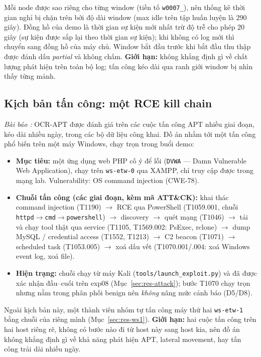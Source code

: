 Mỗi node được sao riêng cho từng window (tiền tố \texttt{w0007\_}), nên thống kê thời gian nghỉ bị chặn trên bởi độ dài window (max idle trên tập huấn luyện là 290 giây). Đồng hồ của demo là thời gian sự kiện mới nhất trừ độ trễ cho phép 20 giây (sự kiện được sắp lại theo thời gian sự kiện); khi không có log mới thì chuyển sang đồng hồ của máy chủ. Window bắt đầu trước khi bắt đầu thu thập được đánh dấu \emph{partial} và không chấm. \textbf{Giới hạn:} không khẳng định gì về chất lượng phát hiện trên toàn bộ log; tấn công kéo dài qua ranh giới window bị nhìn thấy từng mảnh.

\subsection{Kịch bản tấn công: một RCE kill chain}
\label{sec:dev-attack}

\textit{Bài báo \cite{aly2025ocrapt}:} OCR-APT được đánh giá trên các cuộc tấn công APT nhiều giai đoạn, kéo dài nhiều ngày, trong các bộ dữ liệu công khai. Đồ án nhắm tới một tấn công phổ biến trên một máy Windows, chạy trọn trong buổi demo:
\begin{itemize}
    \item \textbf{Mục tiêu:} một ứng dụng web PHP cố ý để lỗi (\texttt{DVWA} --- Damn Vulnerable Web Application), chạy trên \texttt{ws-etw-0} qua XAMPP, chỉ truy cập được trong mạng lab. Vulnerability: OS command injection (CWE-78).
    \item \textbf{Chuỗi tấn công (các giai đoạn, kèm mã ATT\&CK):} khai thác command injection (T1190) $\rightarrow$ RCE qua PowerShell (T1059.001, chuỗi \texttt{httpd}$\to$\texttt{cmd}$\to$\texttt{powershell}) $\rightarrow$ discovery $\rightarrow$ quét mạng (T1046) $\rightarrow$ tải và chạy tool thật qua service (T1105, T1569.002: PsExec, rclone) $\rightarrow$ dump MySQL / credential access (T1552, T1213) $\rightarrow$ C2 beacon (T1071) $\rightarrow$ scheduled task (T1053.005) $\rightarrow$ xoá dấu vết (T1070.001/.004: xoá Windows event log, xoá file).
    \item \textbf{Hiện trạng:} chuỗi chạy từ máy Kali (\texttt{tools/launch\_exploit.py}) và đã được xác nhận đầu--cuối trên exp08 (Mục~\ref{sec:res-attack}); bước T1070 chạy trọn nhưng nằm trong phân phối benign nên \emph{không} nâng mức cảnh báo (D5/D8).
\end{itemize}
Ngoài kịch bản này, một thành viên nhóm tự tấn công máy thứ hai \texttt{ws-etw-1} bằng chuỗi của riêng mình (Mục~\ref{sec:res-ws1}). \textbf{Giới hạn:} hai cuộc tấn công trên hai host riêng rẽ, không có bước nào đi từ host này sang host kia, nên đồ án không khẳng định gì về khả năng phát hiện APT, lateral movement, hay tấn công trải dài nhiều ngày.

